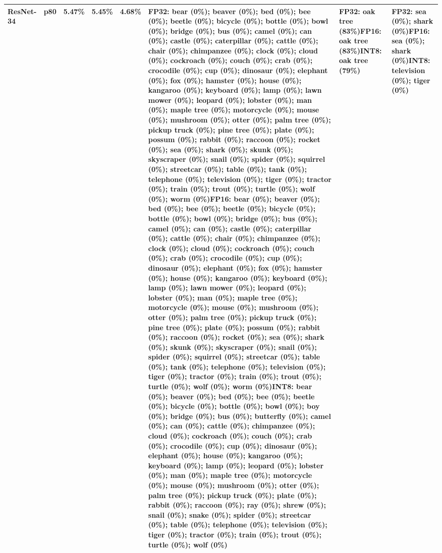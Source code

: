 \begin{longtable}{p{2.8cm} r r r r p{5.0cm} p{4.2cm} p{4.2cm}}
ResNet-34 & p80 & 5.47\% & 5.45\% & 4.68\% & FP32: bear (0\%); beaver (0\%); bed (0\%); bee (0\%); beetle (0\%); bicycle (0\%); bottle (0\%); bowl (0\%); bridge (0\%); bus (0\%); camel (0\%); can (0\%); castle (0\%); caterpillar (0\%); cattle (0\%); chair (0\%); chimpanzee (0\%); clock (0\%); cloud (0\%); cockroach (0\%); couch (0\%); crab (0\%); crocodile (0\%); cup (0\%); dinosaur (0\%); elephant (0\%); fox (0\%); hamster (0\%); house (0\%); kangaroo (0\%); keyboard (0\%); lamp (0\%); lawn mower (0\%); leopard (0\%); lobster (0\%); man (0\%); maple tree (0\%); motorcycle (0\%); mouse (0\%); mushroom (0\%); otter (0\%); palm tree (0\%); pickup truck (0\%); pine tree (0\%); plate (0\%); possum (0\%); rabbit (0\%); raccoon (0\%); rocket (0\%); sea (0\%); shark (0\%); skunk (0\%); skyscraper (0\%); snail (0\%); spider (0\%); squirrel (0\%); streetcar (0\%); table (0\%); tank (0\%); telephone (0\%); television (0\%); tiger (0\%); tractor (0\%); train (0\%); trout (0\%); turtle (0\%); wolf (0\%); worm (0\%)\newline FP16: bear (0\%); beaver (0\%); bed (0\%); bee (0\%); beetle (0\%); bicycle (0\%); bottle (0\%); bowl (0\%); bridge (0\%); bus (0\%); camel (0\%); can (0\%); castle (0\%); caterpillar (0\%); cattle (0\%); chair (0\%); chimpanzee (0\%); clock (0\%); cloud (0\%); cockroach (0\%); couch (0\%); crab (0\%); crocodile (0\%); cup (0\%); dinosaur (0\%); elephant (0\%); fox (0\%); hamster (0\%); house (0\%); kangaroo (0\%); keyboard (0\%); lamp (0\%); lawn mower (0\%); leopard (0\%); lobster (0\%); man (0\%); maple tree (0\%); motorcycle (0\%); mouse (0\%); mushroom (0\%); otter (0\%); palm tree (0\%); pickup truck (0\%); pine tree (0\%); plate (0\%); possum (0\%); rabbit (0\%); raccoon (0\%); rocket (0\%); sea (0\%); shark (0\%); skunk (0\%); skyscraper (0\%); snail (0\%); spider (0\%); squirrel (0\%); streetcar (0\%); table (0\%); tank (0\%); telephone (0\%); television (0\%); tiger (0\%); tractor (0\%); train (0\%); trout (0\%); turtle (0\%); wolf (0\%); worm (0\%)\newline INT8: bear (0\%); beaver (0\%); bed (0\%); bee (0\%); beetle (0\%); bicycle (0\%); bottle (0\%); bowl (0\%); boy (0\%); bridge (0\%); bus (0\%); butterfly (0\%); camel (0\%); can (0\%); cattle (0\%); chimpanzee (0\%); cloud (0\%); cockroach (0\%); couch (0\%); crab (0\%); crocodile (0\%); cup (0\%); dinosaur (0\%); elephant (0\%); house (0\%); kangaroo (0\%); keyboard (0\%); lamp (0\%); leopard (0\%); lobster (0\%); man (0\%); maple tree (0\%); motorcycle (0\%); mouse (0\%); mushroom (0\%); otter (0\%); palm tree (0\%); pickup truck (0\%); plate (0\%); rabbit (0\%); raccoon (0\%); ray (0\%); shrew (0\%); snail (0\%); snake (0\%); spider (0\%); streetcar (0\%); table (0\%); telephone (0\%); television (0\%); tiger (0\%); tractor (0\%); train (0\%); trout (0\%); turtle (0\%); wolf (0\%) & FP32: oak tree (83\%)\newline FP16: oak tree (83\%)\newline INT8: oak tree (79\%) & FP32: sea (0\%); shark (0\%)\newline FP16: sea (0\%); shark (0\%)\newline INT8: television (0\%); tiger (0\%) \\ \hline

\end{longtable}
